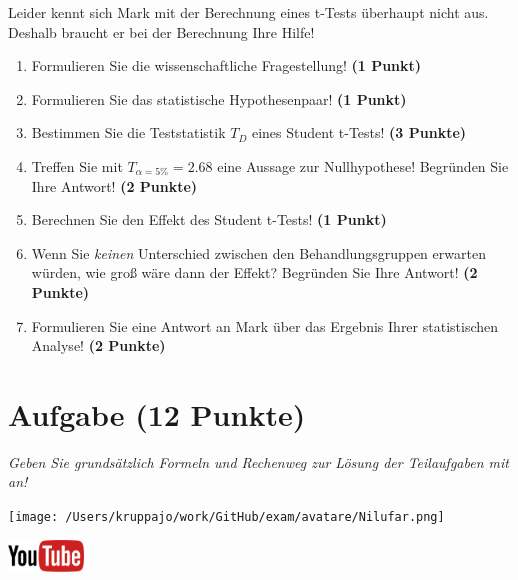 \documentclass[a4paper, 9pt]{scrartcl}\usepackage[]{graphicx}\usepackage[]{xcolor}
\begin{document}
Leider kennt sich Mark mit der Berechnung eines t-Tests überhaupt nicht aus. Deshalb braucht er bei der Berechnung Ihre Hilfe!

\begin{enumerate}
  \item Formulieren Sie die wissenschaftliche Fragestellung! \textbf{(1 Punkt)}
  \item Formulieren Sie das statistische Hypothesenpaar! \textbf{(1 Punkt)}
  \item Bestimmen Sie die Teststatistik $T_{D}$ eines Student t-Tests! \textbf{(3 Punkte)}
\item Treffen Sie mit $T_{\alpha = 5\%} = 2.68$ eine Aussage zur Nullhypothese! Begründen Sie Ihre Antwort! \textbf{(2 Punkte)}
\item Berechnen Sie den Effekt des Student t-Tests! \textbf{(1 Punkt)}
\item Wenn Sie \textit{keinen} Unterschied zwischen den Behandlungsgruppen erwarten würden, wie groß wäre dann der Effekt? Begründen Sie Ihre Antwort! \textbf{(2 Punkte)}
\item Formulieren Sie eine Antwort an Mark über das Ergebnis Ihrer statistischen Analyse! \textbf{(2 Punkte)}
\end{enumerate} 
\clearpage

\section{Aufgabe \hfill (12 Punkte)}

\textit{Geben Sie grundsätzlich Formeln und Rechenweg zur Lösung der Teilaufgaben mit an!} \\[1Ex]
 

 
\begin{minipage}[t]{0.5\textwidth}
\texttt{[image: /Users/kruppajo/work/GitHub/exam/avatare/Nilufar.png]}
\end{minipage}
\begin{minipage}[t]{0.5\textwidth}
\hfill
\href{https://youtu.be/TbSEOMCQYl4}{\includegraphics[width = 2cm]{img/youtube}}\\[1Ex]
\end{minipage}
\vspace{1ex}
\end{document}
